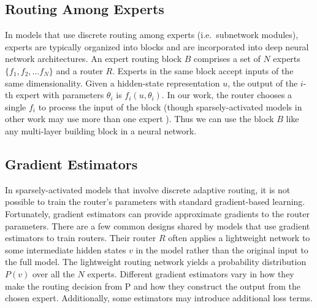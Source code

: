 \documentclass{article}
\theoremstyle{plain}
\theoremstyle{definition}
\theoremstyle{remark}
\begin{document}
\subsection{Routing Among Experts}

In models that use discrete routing among experts (i.e.\ subnetwork modules), experts are typically organized into blocks and are incorporated into deep neural network architectures. 
An expert routing block $B$ comprises a set of $N$ experts $\{f_1, f_2, \dots f_N\}$ and a router $R$. 
Experts in the same block accept inputs of the same dimensionality.
Given a hidden-state representation $u$, the output of the $i$-th expert with parameters $\theta_i$ is $f_i(u, \theta_i)$.  
In our work, the router chooses a single $f_i$ to process the input of the block (though sparsely-activated models in other work may use more than one expert \citep{shazeer2017outrageously, du2022glam}). %
Thus we can use the block $B$ like any multi-layer building block in a neural network. %

\subsection{Gradient Estimators}
\label{sec:estimators}

In sparsely-activated models that involve discrete adaptive routing, it is not possible to train the router's parameters with standard gradient-based learning.
Fortunately, gradient estimators can provide approximate gradients to the router parameters.
There are a few common designs shared by models that use gradient estimators to train routers. 
Their router $R$ often applies a lightweight network to some intermediate hidden states $v$ in the model rather than the original input to the full model. 
The lightweight routing network yields a probability distribution $P(v)$ over all the $N$ experts. 
Different gradient estimators vary in how they make the routing decision from P and how they construct the output from the chosen expert. 
Additionally, some estimators may introduce additional loss terms.
\end{document}
